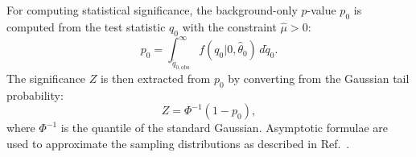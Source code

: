 \noindent For computing statistical significance, the background-only $p$-value $p_{0}$ is computed from the test statistic $q_{0}$ with the constraint $\hat{\mu} > 0$:
\begin{equation}
p_{0} = \int_{\tilde{q}_{0,\mathrm{obs}}}^{\infty} f(q_{0}|0,\hat{\theta}_{0}) \, d\tilde{q}_{0}.
\end{equation}
The significance $Z$ is then extracted from $p_{0}$ by converting from the Gaussian tail probability:
\begin{equation}
Z = \Phi^{-1}(1-p_{0}),
\end{equation}
where $\Phi^{-1}$ is the quantile of the standard Gaussian. Asymptotic formulae are used to approximate the sampling distributions as described in Ref.~\cite{stats_stuff}.
